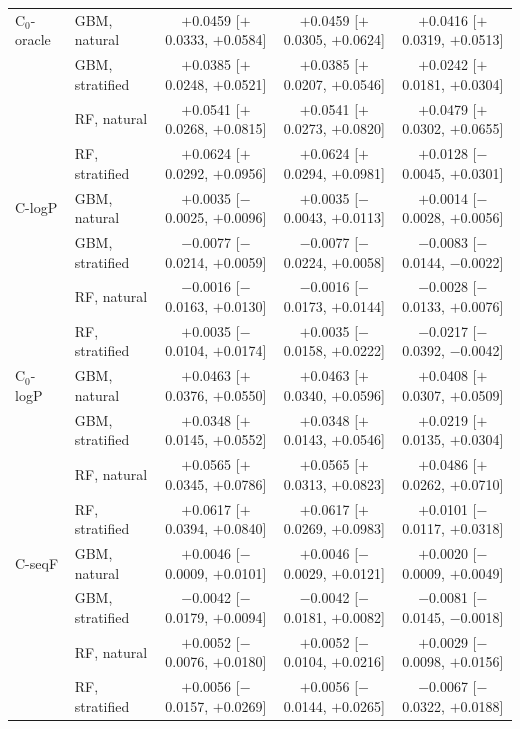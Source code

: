 \begin{longtable}{llccc}
\addlinespace
C$_0$-oracle & GBM, natural & $+$0.0459 [$+$0.0333, $+$0.0584] & $+$0.0459 [$+$0.0305, $+$0.0624] & $+$0.0416 [$+$0.0319, $+$0.0513] \\
 & GBM, stratified & $+$0.0385 [$+$0.0248, $+$0.0521] & $+$0.0385 [$+$0.0207, $+$0.0546] & $+$0.0242 [$+$0.0181, $+$0.0304] \\
 & RF, natural & $+$0.0541 [$+$0.0268, $+$0.0815] & $+$0.0541 [$+$0.0273, $+$0.0820] & $+$0.0479 [$+$0.0302, $+$0.0655] \\
 & RF, stratified & $+$0.0624 [$+$0.0292, $+$0.0956] & $+$0.0624 [$+$0.0294, $+$0.0981] & $+$0.0128 [$-$0.0045, $+$0.0301] \\
\addlinespace
C-logP & GBM, natural & $+$0.0035 [$-$0.0025, $+$0.0096] & $+$0.0035 [$-$0.0043, $+$0.0113] & $+$0.0014 [$-$0.0028, $+$0.0056] \\
 & GBM, stratified & $-$0.0077 [$-$0.0214, $+$0.0059] & $-$0.0077 [$-$0.0224, $+$0.0058] & $-$0.0083 [$-$0.0144, $-$0.0022] \\
 & RF, natural & $-$0.0016 [$-$0.0163, $+$0.0130] & $-$0.0016 [$-$0.0173, $+$0.0144] & $-$0.0028 [$-$0.0133, $+$0.0076] \\
 & RF, stratified & $+$0.0035 [$-$0.0104, $+$0.0174] & $+$0.0035 [$-$0.0158, $+$0.0222] & $-$0.0217 [$-$0.0392, $-$0.0042] \\
\addlinespace
C$_0$-logP & GBM, natural & $+$0.0463 [$+$0.0376, $+$0.0550] & $+$0.0463 [$+$0.0340, $+$0.0596] & $+$0.0408 [$+$0.0307, $+$0.0509] \\
 & GBM, stratified & $+$0.0348 [$+$0.0145, $+$0.0552] & $+$0.0348 [$+$0.0143, $+$0.0546] & $+$0.0219 [$+$0.0135, $+$0.0304] \\
 & RF, natural & $+$0.0565 [$+$0.0345, $+$0.0786] & $+$0.0565 [$+$0.0313, $+$0.0823] & $+$0.0486 [$+$0.0262, $+$0.0710] \\
 & RF, stratified & $+$0.0617 [$+$0.0394, $+$0.0840] & $+$0.0617 [$+$0.0269, $+$0.0983] & $+$0.0101 [$-$0.0117, $+$0.0318] \\
\addlinespace
C-seqF & GBM, natural & $+$0.0046 [$-$0.0009, $+$0.0101] & $+$0.0046 [$-$0.0029, $+$0.0121] & $+$0.0020 [$-$0.0009, $+$0.0049] \\
 & GBM, stratified & $-$0.0042 [$-$0.0179, $+$0.0094] & $-$0.0042 [$-$0.0181, $+$0.0082] & $-$0.0081 [$-$0.0145, $-$0.0018] \\
 & RF, natural & $+$0.0052 [$-$0.0076, $+$0.0180] & $+$0.0052 [$-$0.0104, $+$0.0216] & $+$0.0029 [$-$0.0098, $+$0.0156] \\
 & RF, stratified & $+$0.0056 [$-$0.0157, $+$0.0269] & $+$0.0056 [$-$0.0144, $+$0.0265] & $-$0.0067 [$-$0.0322, $+$0.0188] \\

\end{longtable}
